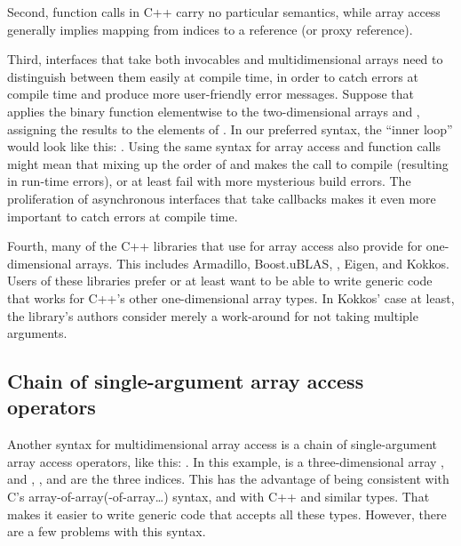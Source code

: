 \documentclass{wg21}
\begin{document}
Second, function calls in C++ carry no particular semantics, while array access generally implies mapping from indices to a reference (or proxy reference).

Third, interfaces that take both invocables and multidimensional arrays need to distinguish between them easily at compile time, in order to catch errors at compile time and produce more user-friendly error messages.  Suppose that  applies the binary function  elementwise to the two-dimensional arrays  and , assigning the results to the elements of .  In our preferred syntax, the ``inner loop'' would look like this: .  Using the same syntax for array access and function calls might mean that mixing up the order of  and  makes the call to  compile (resulting in run-time errors), or at least fail with more mysterious build errors.  The proliferation of asynchronous interfaces that take callbacks makes it even more important to catch errors at compile time.

Fourth, many of the C++ libraries that use  for array access also provide  for one-dimensional arrays.  This includes Armadillo, Boost.uBLAS, , Eigen, and Kokkos.  Users of these libraries prefer  or at least want to be able to write generic code that works for C++'s other one-dimensional array types.  In Kokkos' case at least, the library's authors consider  merely a work-around for  not taking multiple arguments.

\subsection{Chain of single-argument array access operators}

Another syntax for multidimensional array access is a chain of single-argument array access operators, like this: .  In this example,  is a three-dimensional array , and , , and  are the three indices.  This has the advantage of being consistent with C's array-of-array(-of-array\ldots) syntax, and with C++  and similar types.  That makes it easier to write generic code that accepts all these types.  However, there are a few problems with this syntax.
\end{document}
